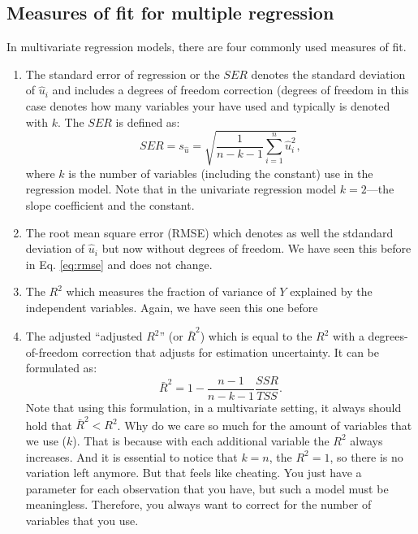 \documentclass[
]{book}
\providecommand{\tightlist}{%
  \setlength{\itemsep}{0pt}\setlength{\parskip}{0pt}}
\begin{document}
\hypertarget{measures-of-fit-for-multiple-regression}{%
\subsection{Measures of fit for multiple regression}\label{measures-of-fit-for-multiple-regression}}

In multivariate regression models, there are four commonly used measures of fit.

\begin{enumerate}
\def\labelenumi{\arabic{enumi}.}
\tightlist
\item
  The standard error of regression or the \(SER\) denotes the standard deviation of \(\hat{u}_i\) and includes a degrees of freedom correction (degrees of freedom in this case denotes how many variables your have used and typically is denoted with \(k\). The \(SER\) is defined as:
  \begin{equation}
  SER = s_{\hat{u}} = \sqrt{\frac{1}{n-k-1} \sum_{i=1}^n \hat{u}^2_i},
  \end{equation}
  where \(k\) is the number of variables (including the constant) use in the regression model. Note that in the univariate regression model \(k=2\)---the slope coefficient and the constant.
\item
  The root mean square error (RMSE) which denotes as well the stdandard deviation of \(\hat{u}_i\) but now without degrees of freedom. We have seen this before in Eq. \eqref{eq:rmse} and does not change.
\item
  The \(R^2\) which measures the fraction of variance of \(Y\) explained by the independent variables. Again, we have seen this one before
\item
  The adjusted ``adjusted \(R^2\)'' (or \(\bar{R}^2\)) which is equal to the \(R^2\) with a degrees-of-freedom correction that adjusts for estimation uncertainty. It can be formulated as:
  \begin{equation}
  \bar{R}^2 = 1 - \frac{n-1}{n-k-1}\frac{SSR}{TSS}.
  \end{equation}
  Note that using this formulation, in a multivariate setting, it always should hold that \(\bar{R}^2 <R^2\). Why do we care so much for the amount of variables that we use (\(k\)). That is because with each additional variable the \(R^2\) always increases. And it is essential to notice that \(k=n\), the \(R^2 = 1\), so there is no variation left anymore. But that feels like cheating. You just have a parameter for each observation that you have, but such a model must be meaningless. Therefore, you always want to correct for the number of variables that you use.
\end{enumerate}
\end{document}
